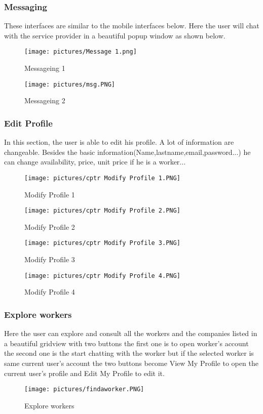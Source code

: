 \documentclass[12pt]{report}
\begin{document}
\subsubsection{Messaging}
These interfaces are similar to the mobile interfaces below. Here the user will chat with the service provider in a beautiful popup window as shown below.


\begin{figure}[!htbp]
    \centering
    \texttt{[image: pictures/Message 1.png]}
    \caption{Messageing 1}
    \label{fig:14}
\end{figure}

\begin{figure}[!htbp]
    \centering
    \texttt{[image: pictures/msg.PNG]}
    \caption{Messageing 2}
    \label{fig:14}
\end{figure}
\pagebreak



\subsubsection{Edit Profile}
In this section, the user is able to edit his profile. A lot of information are changeable. Besides the basic information(Name,lastname,email,password...) he can change availability, price, unit price if he is a worker...
\begin{figure}[!htbp]
    \centering
    \texttt{[image: pictures/cptr Modify Profile 1.PNG]}
    \caption{Modify Profile 1}
    \label{fig:15}
\end{figure}

\begin{figure}[!htbp]
    \centering
    \texttt{[image: pictures/cptr Modify Profile 2.PNG]}
    \caption{Modify Profile 2}
    \label{fig:16}
\end{figure}

\begin{figure}[!htbp]
    \centering
    \texttt{[image: pictures/cptr Modify Profile 3.PNG]}
    \caption{Modify Profile 3}
    \label{fig:17}
\end{figure}

\begin{figure}[!htbp]
    \centering
    \texttt{[image: pictures/cptr Modify Profile 4.PNG]}
    \caption{Modify Profile 4}
    \label{fig:18}
\end{figure}
\pagebreak
\subsubsection{Explore workers}
Here the user can explore and consult all the workers and the companies listed in a beautiful gridview with two buttons the first one is to open worker's account the second one is the start chatting with the worker but if the selected worker is same current user's account the two buttons become View My Profile to open the current user's profile and Edit My Profile to edit it.
\begin{figure}[!htbp]
    \centering
    \texttt{[image: pictures/findaworker.PNG]}
    \caption{Explore workers}
    \label{fig:19}
\end{figure}
\end{document}
